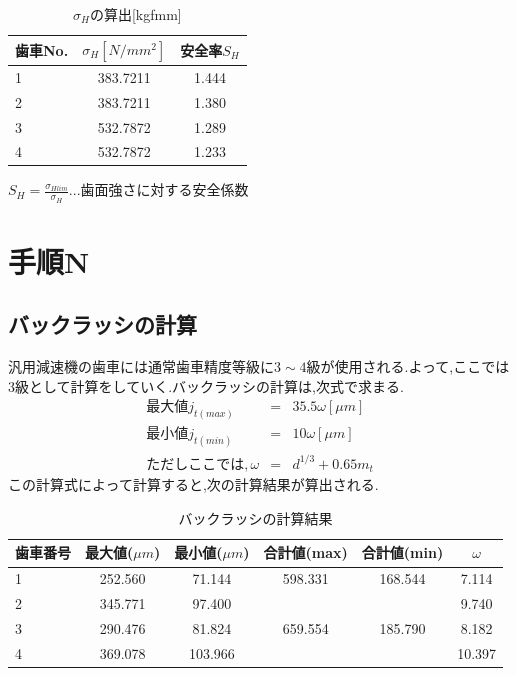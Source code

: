 \begin{table}[htb]
\begin{center}
  \caption{$\sigma_H$の算出[kgfmm]}
  \begin{tabular}{|l|c|c|} \hline
    歯車No.&$\sigma_H[N/mm^2]$&安全率$S_H$\\
\hline
1&383.7211&1.444\\
2&383.7211&1.380\\
3&532.7872&1.289\\
4&532.7872&1.233\\
    \hline
  \end{tabular}
\end{center}
\end{table}
$S_H=\frac{\sigma_{Hlim}}{\sigma_{H}}...歯面強さに対する安全係数$\\
\section{手順N}
\subsection{バックラッシの計算}
汎用減速機の歯車には通常歯車精度等級に$3\sim 4$級が使用される.よって,ここでは3級として計算をしていく.バックラッシの計算は,次式で求まる.
\begin{eqnarray}
最大値　j_{t(max)}&=&35.5 \omega  [\mu m]\nonumber\\
最小値　j_{t(min)}&=&10 \omega  [\mu m]\nonumber\\
ただしここでは, \omega &=& d^{1/3} + 0.65 m_t\nonumber
\end{eqnarray}
この計算式によって計算すると,次の計算結果が算出される.
\begin{table}[htb]
\begin{center}
  \caption{バックラッシの計算結果}
  \begin{tabular}{|l||c|c|c|c|c|} \hline
歯車番号&最大値($\mu m$)&最小値($\mu m$)&合計値(max)&合計値(min)&$\omega$\\
\hline
1&252.560& 71.144&598.331&168.544& 7.114\\
2&345.771& 97.400&       &       & 9.740\\
3&290.476& 81.824&659.554&185.790& 8.182\\
4&369.078&103.966&       &       &10.397\\
\hline
  \end{tabular}
\end{center}
\end{table}

